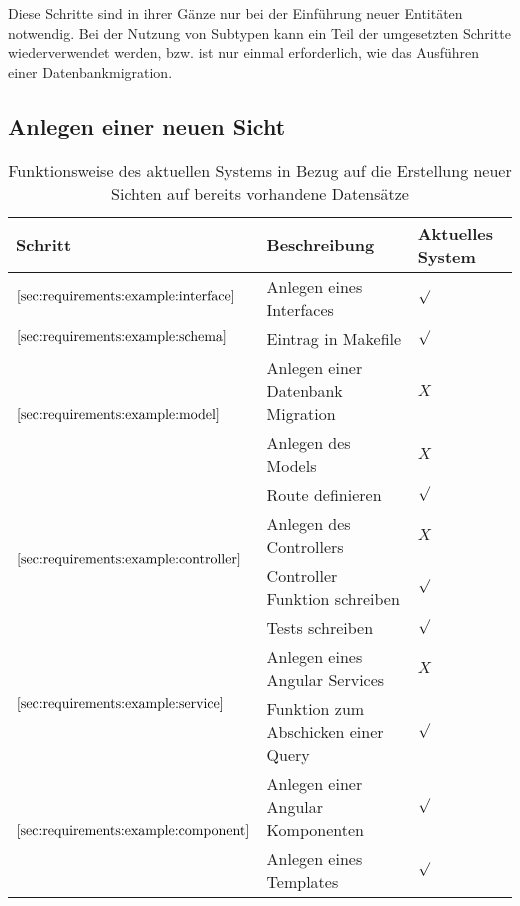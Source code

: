 Diese Schritte sind in ihrer Gänze nur bei der Einführung neuer Entitäten notwendig.
Bei der Nutzung von Subtypen kann ein Teil der umgesetzten Schritte wiederverwendet werden,
bzw. ist nur einmal erforderlich, wie das Ausführen einer Datenbankmigration.

\subsection{Anlegen einer neuen Sicht}
\label{sec:requirements:example:newview}

\begin{table}[h!]
	\begin{tabular}{|p{}|p{}|p{}|}
		\hline
		\textbf{Schritt} & \textbf{Beschreibung} & \textbf{Aktuelles \newline System} \\ \hline
		$\ref{sec:requirements:example:interface}$ & Anlegen eines Interfaces & $\surd$  \\ \hline
		$\ref{sec:requirements:example:schema}$ & Eintrag in Makefile & $\surd$\\ \hline
		\multirow{2}{*}{$\ref{sec:requirements:example:model}$}
		& Anlegen einer Datenbank Migration & $X$  \\
		& Anlegen des Models & $X$ \\ \hline
		\multirow{4}{*}{$\ref{sec:requirements:example:controller}$}
		& Route definieren & $\surd$  \\
		& Anlegen des Controllers & $X$  \\
		& Controller Funktion schreiben & $\surd$  \\
		& Tests schreiben & $\surd$  \\ \hline
		\multirow{2}{*}{$\ref{sec:requirements:example:service}$}
		& Anlegen eines Angular Services & $X$  \\
		& Funktion zum Abschicken einer Query & $\surd$  \\ \hline
		\multirow{2}{*}{$\ref{sec:requirements:example:component}$}
		& Anlegen einer Angular Komponenten & $\surd$  \\
		& Anlegen eines Templates & $\surd$  \\ \hline
	\end{tabular}
	\vspace{5pt}
	\centering
	\caption{Funktionsweise des aktuellen Systems in Bezug auf die Erstellung neuer Sichten auf bereits vorhandene Datensätze}
	\label{tbl:newview}
\end{table}

